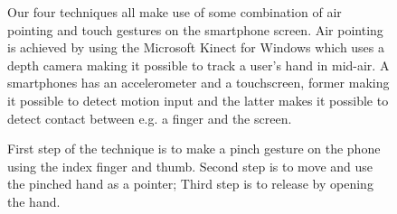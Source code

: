 \begin{figure}
\hspace{0.02\columnwidth}  
\caption{
	\protect{} First step of the \pinch technique is to make a pinch gesture on the phone using the index finger and thumb. Second step is to move and use the pinched hand as a pointer; 
	\protect{} Third step is to release by opening the hand. 
}
\label{fig:pinchTechnique}

Our four techniques all make use of some combination of air pointing and touch gestures on the smartphone screen.
Air pointing is achieved by using the Microsoft Kinect for Windows which uses a depth camera making it possible to track a user's hand in mid-air.
A smartphones has an accelerometer and a touchscreen, former making it possible to detect motion input and the latter makes it possible to detect contact between e.g. a finger and the screen.
\end{figure}